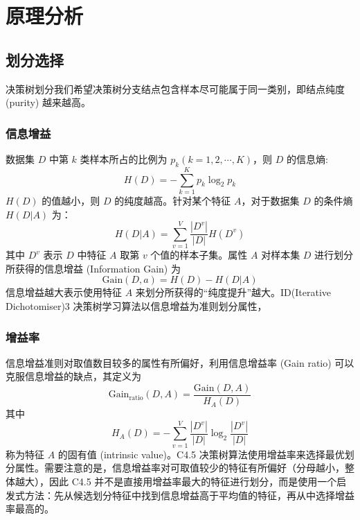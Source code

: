 \documentclass[12pt,AutoFakeBold]{article}
\begin{document}
\section{原理分析}

\subsection{划分选择}

决策树划分我们希望决策树分支结点包含样本尽可能属于同一类别，即结点纯度 (purity) 越来越高。

\subsubsection{信息增益}

数据集 $D$ 中第 $k$ 类样本所占的比例为 $p_k(k=1,2,\cdots,K)$，则 $D$ 的信息熵:
%
\begin{equation}
H(D)=-\sum_{k=1}^{K}p_k\log_2p_k
\end{equation}
%
$H(D)$ 的值越小，则 $D$ 的纯度越高。针对某个特征 $A$，对于数据集 $D$ 的条件熵 $H(D|A)$ 为：
%
\begin{equation}
H(D|A)=\sum_{v=1}^{V}\frac{|D^v|}{|D|}H(D^v)
\end{equation}
%
其中 $D^v$ 表示 $D$ 中特征 $A$ 取第 $v$ 个值的样本子集。属性 $A$ 对样本集 $D$ 进行划分所获得的信息增益 (Information Gain) 为
%
\begin{equation}
\mathrm{Gain}(D,a)=H(D)-H(D|A)
\end{equation}
%
信息增益越大表示使用特征 $A$ 来划分所获得的“纯度提升”越大。ID(Iterative Dichotomiser)3 决策树学习算法以信息增益为准则划分属性，

\subsubsection{增益率}

信息增益准则对取值数目较多的属性有所偏好，利用信息增益率 (Gain ratio) 可以克服信息增益的缺点，其定义为
%
\begin{equation}
\mathrm{Gain}_{\mathrm{ratio}}(D,A)=\frac{\mathrm{Gain}(D,A)}{H_A(D)}
\end{equation}
%
其中
%
\begin{equation}
H_A(D)=-\sum_{v=1}^{V}\frac{|D^v|}{|D|}\log_2\frac{|D^v|}{|D|}
\end{equation}
%
称为特征 $A$ 的固有值 (intrinsic value)。C4.5 决策树算法使用增益率来选择最优划分属性。需要注意的是，信息增益率对可取值较少的特征有所偏好（分母越小，整体越大），因此 C4.5 并不是直接用增益率最大的特征进行划分，而是使用一个启发式方法：先从候选划分特征中找到信息增益高于平均值的特征，再从中选择增益率最高的。
\end{document}
